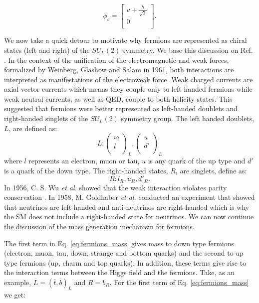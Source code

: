 \begin{equation}
	\phi_c=\begin{bmatrix}
	v+\frac{h}{\sqrt{2}} \\
	0 \\
	\end{bmatrix}.
\end{equation}

We now take a quick detour to motivate why fermions are represented as chiral states (left and right) of the $SU_L(2)$ symmetry. We base this discussion on Ref. \cite{rute}. In the context of the unification of the electromagnetic and weak forces, formalized by Weinberg, Glashow and Salam in 1961, both interactions are interpreted as manifestations of the electroweak force. Weak charged currents are axial vector currents which means they couple only to left handed fermions while weak neutral currents, as well as QED, couple to both helicity states. This suggested that fermions were better represented as left-handed doublets and right-handed singlets of the $SU_L(2)$ symmetry group. The left handed doublets, $L$, are defined as:
\begin{equation}
L:\begin{pmatrix}
\nu_l \\
l \\
\end{pmatrix}_L,
\begin{pmatrix}
u \\
d' \\
\end{pmatrix}_L
\end{equation}
where $l$ represents an electron, muon or tau, $u$ is any quark of the up type and $d'$ is a quark of the down type. The right-handed states, $R$, are singlets, define as:
\begin{equation}
	R: l_R,u_R,d'_R.
\end{equation} 
In 1956, C. S. Wu \textit{et al.} showed that the weak interaction violates parity conservation \cite{wu}. In 1958, M. Goldhaber \textit{et al.} conducted an experiment that showed that neutrinos are left-handed and anti-neutrinos are right-handed \cite{goldhaber} which is why the SM does not include a right-handed state for neutrinos. 
We can now continue the discussion of the mass generation mechanism for fermions.

The first term in Eq. \ref{eq:fermions_mass} gives mass to down type fermions (electron, muon, tau, down, strange and bottom quarks) and the second to up type fermions (up, charm and top quarks). In addition, these terms give rise to the interaction terms between the Higgs field and the fermions. Take, as an example, $\overline{L}=(\overline{t}, \overline{b})_L$ and $R=b_R$. For the first term of Eq. \ref{eq:fermions_mass} we get:

